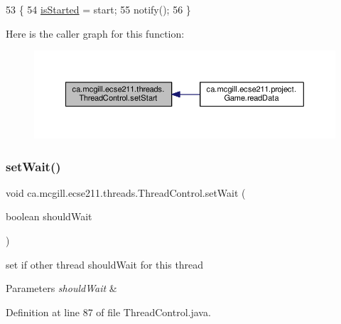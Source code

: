 \begin{DoxyCode}
53                                                    \{
54     \hyperlink{classca_1_1mcgill_1_1ecse211_1_1threads_1_1_thread_control_a92f4933511db42476e39956246bcf2fe}{isStarted} = start;
55     notify();
56   \}
\end{DoxyCode}
Here is the caller graph for this function\+:\nopagebreak
\begin{figure}[H]
\begin{center}
\leavevmode
\includegraphics[width=350pt]{classca_1_1mcgill_1_1ecse211_1_1threads_1_1_thread_control_a16221cdc4ccf637b190934549c708e1f_icgraph}
\end{center}
\end{figure}
\mbox{\label{classca_1_1mcgill_1_1ecse211_1_1threads_1_1_thread_control_a7759a6f52b56e15cb37cd25ea31c93c1}} 
\subsubsection{\texorpdfstring{set\+Wait()}{setWait()}}
{\footnotesize\ttfamily void ca.\+mcgill.\+ecse211.\+threads.\+Thread\+Control.\+set\+Wait (\begin{DoxyParamCaption}\item[{boolean}]{should\+Wait }\end{DoxyParamCaption})}

set if other thread should\+Wait for this thread


\begin{DoxyParams}{Parameters}
{\em should\+Wait} & \\
\hline
\end{DoxyParams}


Definition at line 87 of file Thread\+Control.\+java.


